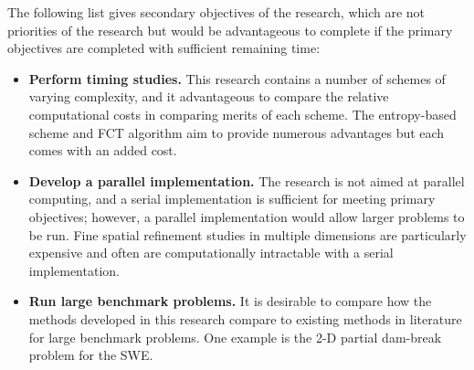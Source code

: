 The following list gives secondary objectives of the research, which are
not priorities of the research but would be advantageous to complete
if the primary objectives are completed with sufficient remaining time:

\begin{itemize}
  \item \textbf{Perform timing studies.}
    This research contains a number of schemes of varying complexity, and
    it advantageous to compare the relative computational costs in
    comparing merits of each scheme. The entropy-based scheme and FCT
    algorithm aim to provide numerous advantages but each comes with
    an added cost.
  \item \textbf{Develop a parallel implementation.}
    The research is not aimed at parallel computing, and a serial
    implementation is sufficient for meeting primary objectives;
    however, a parallel implementation would allow larger problems
    to be run. Fine spatial refinement studies in multiple dimensions
    are particularly expensive and often are computationally intractable
    with a serial implementation.
  \item \textbf{Run large benchmark problems.}
    It is desirable to compare how the methods developed in this research
    compare to existing methods in literature for large benchmark
    problems. One example is the 2-D partial dam-break problem for the SWE.
\end{itemize}

